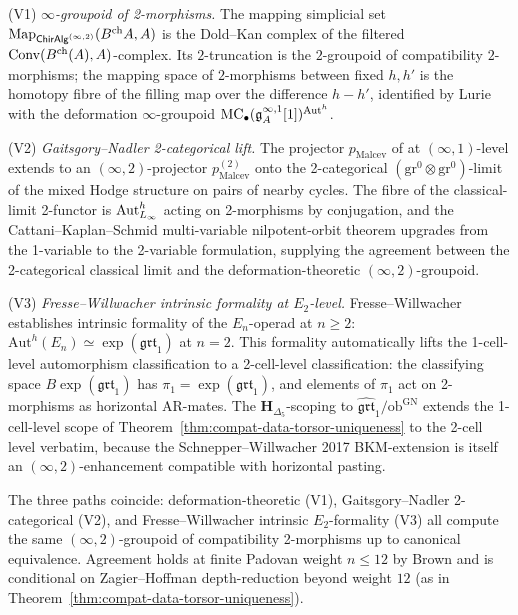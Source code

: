 \begin{remark}
\label{rem:infty-two-three-paths}
%
\textup{(V1)} \emph{$\infty$-groupoid of 2-morphisms.} The mapping
simplicial set
$\mathrm{Map}_{\mathsf{ChirAlg}^{(\infty,2)}}(B^{\mathrm{ch}} A,A)$ is the
Dold--Kan complex of the filtered
$\mathrm{Conv}(B^{\mathrm{ch}}(A),A)$-complex. Its $2$-truncation is the
$2$-groupoid of compatibility $2$-morphisms; the mapping space of
$2$-morphisms between fixed $h,h'$ is the homotopy fibre of the
filling map over the difference $h-h'$, identified by
Lurie \cite[Proposition~5.5.1.1]{LurieHA} with the deformation
$\infty$-groupoid $\mathrm{MC}_\bullet(\mathfrak{g}^{\infty,1}_A[1])^{\operatorname{Aut}^h}$.

\textup{(V2)} \emph{Gaitsgory--Nadler 2-categorical lift.}
The projector $p_{\mathrm{Malcev}}$ of
\cite[]{GaitsgoryNadler2009} at $(\infty,1)$-level
extends to an $(\infty,2)$-projector $p^{(2)}_{\mathrm{Malcev}}$
onto the 2-categorical $(\mathrm{gr}^0\otimes\mathrm{gr}^0)$-limit
of the mixed Hodge structure on pairs of nearby cycles. The fibre of
the classical-limit 2-functor is $\operatorname{Aut}^h_{L_\infty}$ acting on
2-morphisms by conjugation, and the Cattani--Kaplan--Schmid
multi-variable nilpotent-orbit theorem
\cite[]{CattaniKaplanSchmid1986} upgrades from the
1-variable to the 2-variable formulation, supplying the agreement
between the 2-categorical classical limit and the
deformation-theoretic $(\infty,2)$-groupoid.

\textup{(V3)} \emph{Fresse--Willwacher intrinsic formality at
$E_2$-level.} Fresse--Willwacher \cite[Theorem~B]{FresseWillwacher20}
establishes intrinsic formality of the $E_n$-operad at $n\ge 2$:
$\mathrm{Aut}^h(E_n)\simeq\exp(\mathfrak{grt}_1)$ at $n=2$. This
formality automatically lifts the 1-cell-level automorphism
classification to a 2-cell-level classification: the classifying space
$B\exp(\mathfrak{grt}_1)$ has $\pi_1 = \exp(\mathfrak{grt}_1)$, and
elements of $\pi_1$ act on 2-morphisms as horizontal AR-mates. The
$\mathbf H_{\Delta_5}$-scoping to
$\widehat{\mathfrak{grt}}_1/\mathrm{ob}^{\mathrm{GN}}$ extends the
1-cell-level scope of
Theorem~\textup{\ref{thm:compat-data-torsor-uniqueness}} to the
2-cell level verbatim, because the Schnepper--Willwacher 2017
BKM-extension is itself an $(\infty,2)$-enhancement compatible with
horizontal pasting.

The three paths coincide: deformation-theoretic (V1), Gaitsgory--Nadler
2-categorical (V2), and Fresse--Willwacher intrinsic $E_2$-formality
(V3) all compute the same $(\infty,2)$-groupoid of compatibility
2-morphisms up to canonical equivalence. Agreement holds at finite
Padovan weight $n\le 12$ by Brown \cite[Theorem~1.2]{Brown12} and is
conditional on Zagier--Hoffman depth-reduction beyond weight $12$
(as in Theorem~\textup{\ref{thm:compat-data-torsor-uniqueness}}).
\end{remark}


